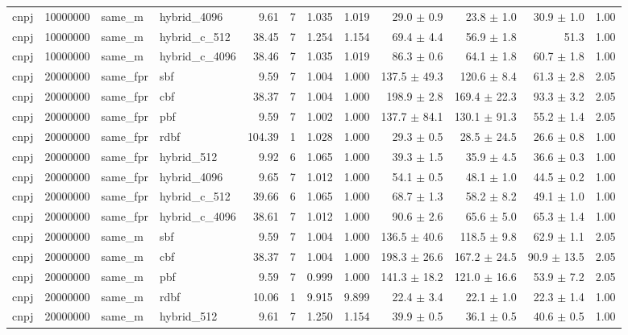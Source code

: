 \begin{tabular}{llllrrrrrrrr}
cnpj & 10000000 & same\_m & hybrid\_4096 & 9.61 & 7 & 1.035 & 1.019 & 29.0 $\pm$ 0.9 & 23.8 $\pm$ 1.0 & 30.9 $\pm$ 1.0 & 1.00 \\
cnpj & 10000000 & same\_m & hybrid\_c\_512 & 38.45 & 7 & 1.254 & 1.154 & 69.4 $\pm$ 4.4 & 56.9 $\pm$ 1.8 & 51.3 & 1.00 \\
cnpj & 10000000 & same\_m & hybrid\_c\_4096 & 38.46 & 7 & 1.035 & 1.019 & 86.3 $\pm$ 0.6 & 64.1 $\pm$ 1.8 & 60.7 $\pm$ 1.8 & 1.00 \\
cnpj & 20000000 & same\_fpr & sbf & 9.59 & 7 & 1.004 & 1.000 & 137.5 $\pm$ 49.3 & 120.6 $\pm$ 8.4 & 61.3 $\pm$ 2.8 & 2.05 \\
cnpj & 20000000 & same\_fpr & cbf & 38.37 & 7 & 1.004 & 1.000 & 198.9 $\pm$ 2.8 & 169.4 $\pm$ 22.3 & 93.3 $\pm$ 3.2 & 2.05 \\
cnpj & 20000000 & same\_fpr & pbf & 9.59 & 7 & 1.002 & 1.000 & 137.7 $\pm$ 84.1 & 130.1 $\pm$ 91.3 & 55.2 $\pm$ 1.4 & 2.05 \\
cnpj & 20000000 & same\_fpr & rdbf & 104.39 & 1 & 1.028 & 1.000 & 29.3 $\pm$ 0.5 & 28.5 $\pm$ 24.5 & 26.6 $\pm$ 0.8 & 1.00 \\
cnpj & 20000000 & same\_fpr & hybrid\_512 & 9.92 & 6 & 1.065 & 1.000 & 39.3 $\pm$ 1.5 & 35.9 $\pm$ 4.5 & 36.6 $\pm$ 0.3 & 1.00 \\
cnpj & 20000000 & same\_fpr & hybrid\_4096 & 9.65 & 7 & 1.012 & 1.000 & 54.1 $\pm$ 0.5 & 48.1 $\pm$ 1.0 & 44.5 $\pm$ 0.2 & 1.00 \\
cnpj & 20000000 & same\_fpr & hybrid\_c\_512 & 39.66 & 6 & 1.065 & 1.000 & 68.7 $\pm$ 1.3 & 58.2 $\pm$ 8.2 & 49.1 $\pm$ 1.0 & 1.00 \\
cnpj & 20000000 & same\_fpr & hybrid\_c\_4096 & 38.61 & 7 & 1.012 & 1.000 & 90.6 $\pm$ 2.6 & 65.6 $\pm$ 5.0 & 65.3 $\pm$ 1.4 & 1.00 \\
cnpj & 20000000 & same\_m & sbf & 9.59 & 7 & 1.004 & 1.000 & 136.5 $\pm$ 40.6 & 118.5 $\pm$ 9.8 & 62.9 $\pm$ 1.1 & 2.05 \\
cnpj & 20000000 & same\_m & cbf & 38.37 & 7 & 1.004 & 1.000 & 198.3 $\pm$ 26.6 & 167.2 $\pm$ 24.5 & 90.9 $\pm$ 13.5 & 2.05 \\
cnpj & 20000000 & same\_m & pbf & 9.59 & 7 & 0.999 & 1.000 & 141.3 $\pm$ 18.2 & 121.0 $\pm$ 16.6 & 53.9 $\pm$ 7.2 & 2.05 \\
cnpj & 20000000 & same\_m & rdbf & 10.06 & 1 & 9.915 & 9.899 & 22.4 $\pm$ 3.4 & 22.1 $\pm$ 1.0 & 22.3 $\pm$ 1.4 & 1.00 \\
cnpj & 20000000 & same\_m & hybrid\_512 & 9.61 & 7 & 1.250 & 1.154 & 39.9 $\pm$ 0.5 & 36.1 $\pm$ 0.5 & 40.6 $\pm$ 0.5 & 1.00 \\

\end{tabular}
